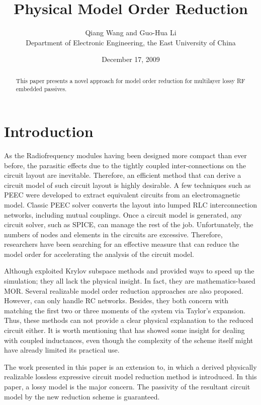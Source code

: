 \documentclass[twocolumn]{article}
\begin{document}
\title{Physical Model Order Reduction}
\author{Qiang Wang and Guo-Hua Li\\
Department of Electronic Engineering,
the East University of China}
\date{December 17, 2009}
\maketitle
\begin{abstract}
This paper presents a novel
approach for model order reduction for multilayer lossy RF
embedded passives.
\end{abstract}

\section{Introduction}
As the Radiofrequency modules having been designed more compact
than ever before, the parasitic effects due to the tightly coupled
inter-connections on the circuit layout are inevitable. Therefore,
an efficient method that can derive a circuit model of such circuit
layout is highly desirable. A few techniques such as PEEC were developed to
extract equivalent circuits from an electromagnetic model.
Classic PEEC solver converts the layout into lumped RLC
interconnection networks, including mutual couplings. Once a circuit
model is generated, any circuit solver, such as SPICE, can manage
the rest of the job. Unfortunately, the numbers of nodes and
elements in the circuits are excessive. Therefore, researchers have
been searching for an effective measure that can reduce the model
order for accelerating the analysis of the circuit model.

Although exploited Krylov
subspace methods and provided ways to speed up the simulation; they
all lack the physical insight. In fact, they are mathematics-based
MOR. Several realizable model order reduction approaches are also
proposed. However, can only handle RC networks. Besides, they both
concern with matching the first two or three moments of the system
via Taylor's expansion. Thus, these methods can not provide a clear
physical explanation to the reduced circuit either. It is worth
mentioning that has showed some insight for
dealing with coupled inductances, even though the complexity of the
scheme itself might have already limited its practical use.

The work presented in this paper is an extension to,
in which a derived physically realizable lossless expressive circuit
model reduction method is introduced. In this paper, a lossy model
is the major concern. The passivity of the resultant circuit model
by the new reduction scheme is guaranteed.
\end{document}
